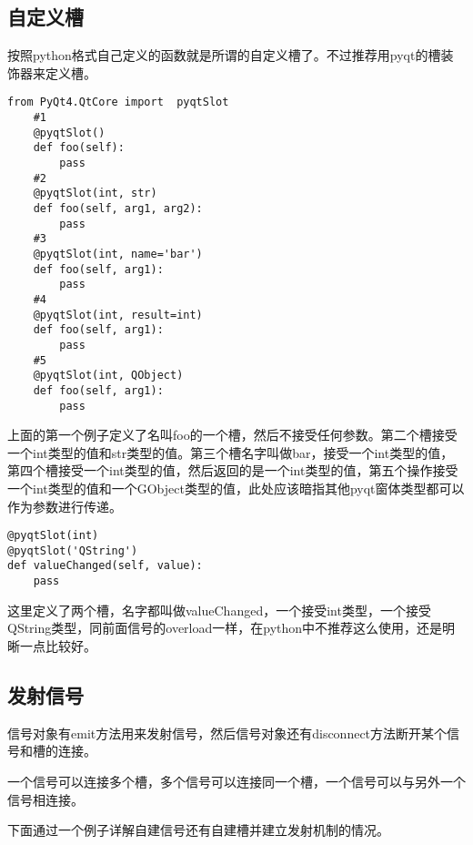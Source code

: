 \documentclass[11pt,oneside]{article}
\begin{document}
\subsection{自定义槽}
\label{sec:orgheadline20}
按照python格式自己定义的函数就是所谓的自定义槽了。不过推荐用pyqt的槽装饰器来定义槽。

\begin{verbatim}
from PyQt4.QtCore import  pyqtSlot
    #1
    @pyqtSlot()
    def foo(self):
        pass
    #2
    @pyqtSlot(int, str)
    def foo(self, arg1, arg2):
        pass
    #3
    @pyqtSlot(int, name='bar')
    def foo(self, arg1):
        pass
    #4
    @pyqtSlot(int, result=int)
    def foo(self, arg1):
        pass
    #5
    @pyqtSlot(int, QObject)
    def foo(self, arg1):
        pass
\end{verbatim}

上面的第一个例子定义了名叫foo的一个槽，然后不接受任何参数。第二个槽接受一个int类型的值和str类型的值。第三个槽名字叫做bar，接受一个int类型的值，第四个槽接受一个int类型的值，然后返回的是一个int类型的值，第五个操作接受一个int类型的值和一个GObject类型的值，此处应该暗指其他pyqt窗体类型都可以作为参数进行传递。

\begin{verbatim}
@pyqtSlot(int)
@pyqtSlot('QString')
def valueChanged(self, value):
    pass
\end{verbatim}

这里定义了两个槽，名字都叫做valueChanged，一个接受int类型，一个接受QString类型，同前面信号的overload一样，在python中不推荐这么使用，还是明晰一点比较好。

\subsection{发射信号}
\label{sec:orgheadline21}
信号对象有emit方法用来发射信号，然后信号对象还有disconnect方法断开某个信号和槽的连接。

一个信号可以连接多个槽，多个信号可以连接同一个槽，一个信号可以与另外一个信号相连接。

下面通过一个例子详解自建信号还有自建槽并建立发射机制的情况。
\end{document}
